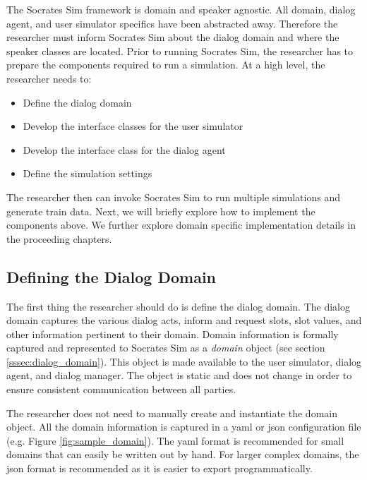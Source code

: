 The Socrates Sim framework is domain and speaker agnostic. All domain, dialog agent, and user simulator specifics have been abstracted away. Therefore the researcher must inform Socrates Sim about the dialog domain and where the speaker classes are located. Prior to running Socrates Sim, the researcher has to prepare the components required to run a simulation. At a high level, the researcher needs to: 
\begin{itemize}
	\item Define the dialog domain 
	\item Develop the interface classes for the user simulator
	\item Develop the interface class for the dialog agent
	\item Define the simulation settings
\end{itemize}

The researcher then can invoke Socrates Sim to run multiple simulations and generate train data. Next, we will briefly explore how to implement the components above. We further explore domain specific implementation details in the proceeding chapters. 

\subsection{Defining the Dialog Domain}

The first thing the researcher should do is define the dialog domain. The dialog domain captures the various dialog acts, inform and request slots, slot values, and other information pertinent to their domain. Domain information is formally captured and represented to Socrates Sim as a \textit{domain} object (see section \ref{sssec:dialog_domain}). This object is made available to the user simulator, dialog agent, and dialog manager. The object is static and does not change in order to ensure consistent communication between all parties. 

The researcher does not need to manually create and instantiate the domain object. All the domain information is captured in a yaml or json configuration file (e.g. Figure \ref{fig:sample_domain}). The yaml format is recommended for small domains that can easily be written out by hand. For larger complex domains, the json format is recommended as it is easier to export programmatically. 

